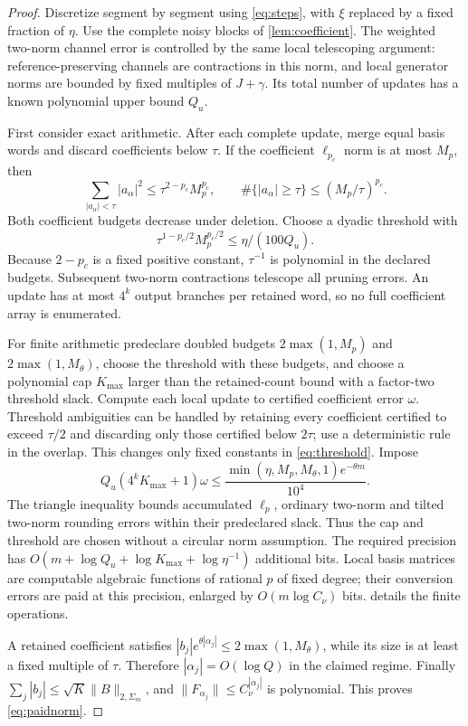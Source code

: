 \documentclass[11pt,reqno]{amsart}
\numberwithin{equation}{section}
\theoremstyle{definition}
\theoremstyle{remark}
\newcommand{\nn}[1]{\lVert#1\rVert}
\begin{document}
\begin{proof}
Discretize segment by segment using \eqref{eq:steps}, with $\xi$ replaced by a fixed fraction of $\eta$. Use the complete noisy blocks of \cref{lem:coefficient}. The weighted two-norm channel error is controlled by the same local telescoping argument: reference-preserving channels are contractions in this norm, and local generator norms are bounded by fixed multiples of $J+\gamma$. Its total number of updates has a known polynomial upper bound $Q_u$.

First consider exact arithmetic. After each complete update, merge equal basis words and discard coefficients below $\tau$. If the coefficient $\ell_{p_c}$ norm is at most $M_p$, then
\begin{equation}\label{eq:threshold}
 \sum_{|a_\alpha|<\tau}|a_\alpha|^2
 \leq\tau^{2-p_c}M_p^{p_c},\qquad
 \#\{|a_\alpha|\geq\tau\}\leq(M_p/\tau)^{p_c}.
\end{equation}
Both coefficient budgets decrease under deletion. Choose a dyadic threshold with
\[
 \tau^{1-p_c/2}M_p^{p_c/2}\leq\eta/(100Q_u).
\]
Because $2-p_c$ is a fixed positive constant, $\tau^{-1}$ is polynomial in the declared budgets. Subsequent two-norm contractions telescope all pruning errors. An update has at most $4^k$ output branches per retained word, so no full coefficient array is enumerated.

For finite arithmetic predeclare doubled budgets $2\max(1,M_p)$ and $2\max(1,M_\theta)$, choose the threshold with these budgets, and choose a polynomial cap $K_{\max}$ larger than the retained-count bound with a factor-two threshold slack. Compute each local update to certified coefficient error $\omega$. Threshold ambiguities can be handled by retaining every coefficient certified to exceed $\tau/2$ and discarding only those certified below $2\tau$; use a deterministic rule in the overlap. This changes only fixed constants in \eqref{eq:threshold}. Impose
\begin{equation}\label{eq:rounding}
 Q_u(4^kK_{\max}+1)\omega
 \leq\frac{\min(\eta,M_p,M_\theta,1)e^{-\theta m}}{10^4}.
\end{equation}
The triangle inequality bounds accumulated $\ell_p$, ordinary two-norm and tilted two-norm rounding errors within their predeclared slack. Thus the cap and threshold are chosen without a circular norm assumption. The required precision has
$O(m+\log Q_u+\log K_{\max}+\log\eta^{-1})$ additional bits. Local basis matrices are computable algebraic functions of rational $p$ of fixed degree; their conversion errors are paid at this precision, enlarged by $O(m\log C_\nu)$ bits.  details the finite operations.

A retained coefficient satisfies
$|b_j|e^{\theta|\alpha_j|}\leq2\max(1,M_\theta)$, while its size is at least a fixed multiple of $\tau$. Therefore $|\alpha_j|=O(\log Q)$ in the claimed regime. Finally $\sum_j|b_j|\leq\sqrt K\nn B_{2,\Sigma_m}$, and $\nn{F_{\alpha_j}}\leq C_\nu^{|\alpha_j|}$ is polynomial. This proves \eqref{eq:paidnorm}.
\end{proof}
\end{document}
